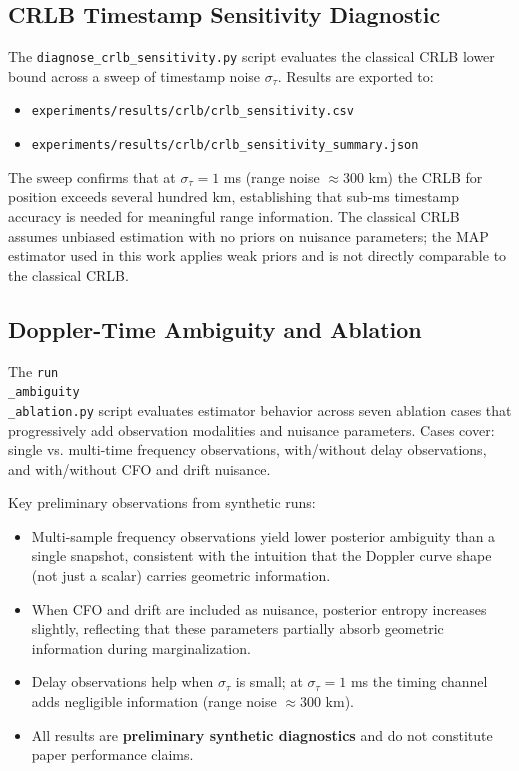 \subsection{CRLB Timestamp Sensitivity Diagnostic}
The \texttt{diagnose\_crlb\_sensitivity.py} script evaluates the classical
CRLB lower bound across a sweep of timestamp noise $\sigma_\tau$.  Results are
exported to:
\begin{itemize}
  \item \texttt{experiments/results/crlb/crlb\_sensitivity.csv}
  \item \texttt{experiments/results/crlb/crlb\_sensitivity\_summary.json}
\end{itemize}
The sweep confirms that at $\sigma_\tau = 1$ ms (range noise $\approx 300$ km)
the CRLB for position exceeds several hundred km, establishing that sub-ms
timestamp accuracy is needed for meaningful range information.  The classical
CRLB assumes unbiased estimation with no priors on nuisance parameters; the
MAP estimator used in this work applies weak priors and is not directly
comparable to the classical CRLB.

\subsection{Doppler-Time Ambiguity and Ablation}
The \texttt{run\\_ambiguity\\_ablation.py} script evaluates estimator behavior
across seven ablation cases that progressively add observation modalities and
nuisance parameters.  Cases cover: single vs. multi-time frequency observations,
with/without delay observations, and with/without CFO and drift nuisance.

Key preliminary observations from synthetic runs:
\begin{itemize}
  \item Multi-sample frequency observations yield lower posterior ambiguity than
        a single snapshot, consistent with the intuition that the Doppler curve
        shape (not just a scalar) carries geometric information.
  \item When CFO and drift are included as nuisance, posterior entropy increases
        slightly, reflecting that these parameters partially absorb geometric
        information during marginalization.
  \item Delay observations help when $\sigma_\tau$ is small; at $\sigma_\tau=1$ ms
        the timing channel adds negligible information (range noise $\approx300$ km).
  \item All results are \textbf{preliminary synthetic diagnostics} and do not
        constitute paper performance claims.
\end{itemize}

